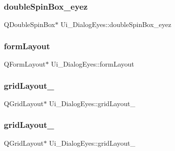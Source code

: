 \hypertarget{class_ui___dialog_eyes_adc1990f769605d17d2d0dce6b2540130}{}\label{class_ui___dialog_eyes_adc1990f769605d17d2d0dce6b2540130} 
\subsubsection{\texorpdfstring{double\+Spin\+Box\+\_\+eyez}{doubleSpinBox\_eyez}}
{\footnotesize\ttfamily Q\+Double\+Spin\+Box$\ast$ Ui\+\_\+\+Dialog\+Eyes\+::double\+Spin\+Box\+\_\+eyez}

\hypertarget{class_ui___dialog_eyes_a83076edd627b19377863a28f11ff74b2}{}\label{class_ui___dialog_eyes_a83076edd627b19377863a28f11ff74b2} 
\subsubsection{\texorpdfstring{form\+Layout}{formLayout}}
{\footnotesize\ttfamily Q\+Form\+Layout$\ast$ Ui\+\_\+\+Dialog\+Eyes\+::form\+Layout}

\hypertarget{class_ui___dialog_eyes_a5957bc0bb2476de51bdc5d3670d147f4}{}\label{class_ui___dialog_eyes_a5957bc0bb2476de51bdc5d3670d147f4} 
\subsubsection{\texorpdfstring{grid\+Layout\+\_}{gridLayout\_2}}
{\footnotesize\ttfamily Q\+Grid\+Layout$\ast$ Ui\+\_\+\+Dialog\+Eyes\+::grid\+Layout\+\_}

\hypertarget{class_ui___dialog_eyes_aca6d083b4e7f08dde22c47e777a07779}{}\label{class_ui___dialog_eyes_aca6d083b4e7f08dde22c47e777a07779} 
\subsubsection{\texorpdfstring{grid\+Layout\+\_}{gridLayout\_3}}
{\footnotesize\ttfamily Q\+Grid\+Layout$\ast$ Ui\+\_\+\+Dialog\+Eyes\+::grid\+Layout\+\_}

